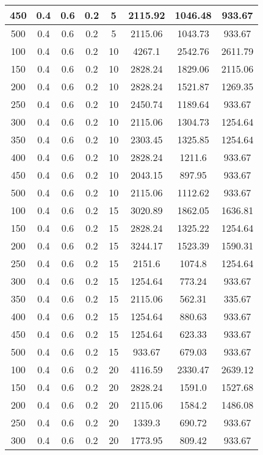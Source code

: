 \documentclass[a4paper, 12pt]{extreport}
\begin{document}
\begin{itemize}
\begin{longtable}{|c|c|c|c|c|c|c|c|}
			450 & 0.4 & 0.6 & 0.2 & 5 & 2115.92 & 1046.48 & 933.67 \\\hline
			500 & 0.4 & 0.6 & 0.2 & 5 & 2115.06 & 1043.73 & 933.67 \\\hline
			100 & 0.4 & 0.6 & 0.2 & 10 & 4267.1 & 2542.76 & 2611.79 \\\hline
			150 & 0.4 & 0.6 & 0.2 & 10 & 2828.24 & 1829.06 & 2115.06 \\\hline
			200 & 0.4 & 0.6 & 0.2 & 10 & 2828.24 & 1521.87 & 1269.35 \\\hline
			250 & 0.4 & 0.6 & 0.2 & 10 & 2450.74 & 1189.64 & 933.67 \\\hline
			300 & 0.4 & 0.6 & 0.2 & 10 & 2115.06 & 1304.73 & 1254.64 \\\hline
			350 & 0.4 & 0.6 & 0.2 & 10 & 2303.45 & 1325.85 & 1254.64 \\\hline
			400 & 0.4 & 0.6 & 0.2 & 10 & 2828.24 & 1211.6 & 933.67 \\\hline
			450 & 0.4 & 0.6 & 0.2 & 10 & 2043.15 & 897.95 & 933.67 \\\hline
			500 & 0.4 & 0.6 & 0.2 & 10 & 2115.06 & 1112.62 & 933.67 \\\hline
			100 & 0.4 & 0.6 & 0.2 & 15 & 3020.89 & 1862.05 & 1636.81 \\\hline
			150 & 0.4 & 0.6 & 0.2 & 15 & 2828.24 & 1325.22 & 1254.64 \\\hline
			200 & 0.4 & 0.6 & 0.2 & 15 & 3244.17 & 1523.39 & 1590.31 \\\hline
			250 & 0.4 & 0.6 & 0.2 & 15 & 2151.6 & 1074.8 & 1254.64 \\\hline
			300 & 0.4 & 0.6 & 0.2 & 15 & 1254.64 & 773.24 & 933.67 \\\hline
			350 & 0.4 & 0.6 & 0.2 & 15 & 2115.06 & 562.31 & 335.67 \\\hline
			400 & 0.4 & 0.6 & 0.2 & 15 & 1254.64 & 880.63 & 933.67 \\\hline
			450 & 0.4 & 0.6 & 0.2 & 15 & 1254.64 & 623.33 & 933.67 \\\hline
			500 & 0.4 & 0.6 & 0.2 & 15 & 933.67 & 679.03 & 933.67 \\\hline
			100 & 0.4 & 0.6 & 0.2 & 20 & 4116.59 & 2330.47 & 2639.12 \\\hline
			150 & 0.4 & 0.6 & 0.2 & 20 & 2828.24 & 1591.0 & 1527.68 \\\hline
			200 & 0.4 & 0.6 & 0.2 & 20 & 2115.06 & 1584.2 & 1486.08 \\\hline
			250 & 0.4 & 0.6 & 0.2 & 20 & 1339.3 & 690.72 & 933.67 \\\hline
			300 & 0.4 & 0.6 & 0.2 & 20 & 1773.95 & 809.42 & 933.67 \\\hline

\end{longtable}
\end{itemize}
\end{document}
